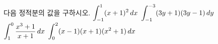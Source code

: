 다음 정적분의 값을 구하시오.
 $\displaystyle\int_{-1}^{1}(x+1)^2\mkern3mu dx$
 $\displaystyle\int_{-1}^{-3}(3y+1)(3y-1)\mkern3mu dy$
 $\displaystyle\int_{1}^{0}\dfrac{x^3+1}{x+1}\mkern3mu dx$
 $\displaystyle\int_{0}^{2}(x-1)(x+1)(x^2+1)\mkern3mu dx$
